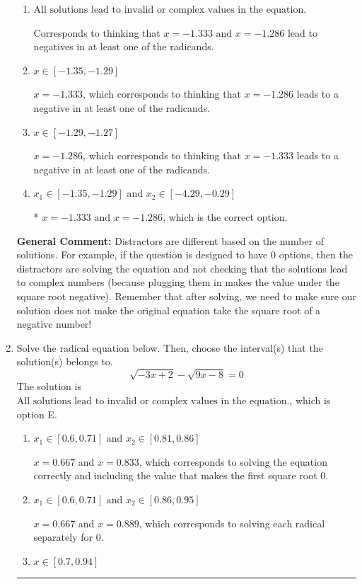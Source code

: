 \documentclass{extbook}[14pt]
\newcommand{\litem}[1]{\item #1

\rule{\textwidth}{0.4pt}}
\begin{document}
\begin{enumerate}
{\begin{enumerate}[label=\Alph*.]
$x = 1.286 \text{ and } x = 1.333$, which are the negative or absolute values of the values you would have gotten by solving the equation correctly.
\item \( \text{All solutions lead to invalid or complex values in the equation.} \)

Corresponds to thinking that $x = -1.333 \text{ and } x = -1.286$ lead to negatives in at least one of the radicands.
\item \( x \in [-1.35,-1.29] \)

$x = -1.333$, which corresponds to thinking that $x = -1.286$ leads to a negative in at least one of the radicands.
\item \( x \in [-1.29,-1.27] \)

$x = -1.286$, which corresponds to thinking that $x = -1.333$ leads to a negative in at least one of the radicands.
\item \( x_1 \in [-1.35, -1.29] \text{ and } x_2 \in [-4.29,-0.29] \)

* $x = -1.333 \text{ and } x = -1.286$, which is the correct option.
\end{enumerate}

\textbf{General Comment:} Distractors are different based on the number of solutions. For example, if the question is designed to have 0 options, then the distractors are solving the equation and not checking that the solutions lead to complex numbers (because plugging them in makes the value under the square root negative). Remember that after solving, we need to make sure our solution does not make the original equation take the square root of a negative number!
}
\litem{
Solve the radical equation below. Then, choose the interval(s) that the solution(s) belongs to.
\[ \sqrt{-3 x + 2} - \sqrt{9 x - 8} = 0 \]The solution is \( \text{All solutions lead to invalid or complex values in the equation.} \), which is option E.\begin{enumerate}[label=\Alph*.]
\item \( x_1 \in [0.6, 0.71] \text{ and } x_2 \in [0.81,0.86] \)

$x = 0.667$ and $x = 0.833$, which corresponds to solving the equation correctly and including the value that makes the first square root 0.
\item \( x_1 \in [0.6, 0.71] \text{ and } x_2 \in [0.86,0.95] \)

$x = 0.667$ and $x = 0.889$, which corresponds to solving each radical separately for 0.
\item \( x \in [0.7,0.94] \)


\end{enumerate}}
\end{enumerate}
\end{document}
